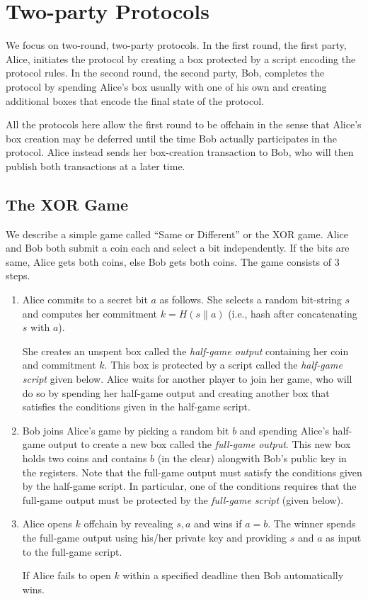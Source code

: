 \documentclass[11pt]{article}
\begin{document}
\section{Two-party Protocols}

We focus on two-round, two-party protocols. %
In the first round, the first party, Alice, initiates the protocol by creating a box  protected by a script encoding the protocol rules. In the second round, the second party, Bob, completes the protocol by spending Alice's box usually with one of his own and creating additional boxes that encode the final state of the protocol. 

All the protocols here allow the first round to be offchain in the sense that Alice's box creation may be deferred until the time Bob actually participates in the protocol. Alice instead sends her box-creation transaction to Bob, who will then publish both transactions at a later time. 
\subsection{The XOR Game}

We describe a simple game called ``Same or Different'' or the XOR game. Alice and Bob both submit a coin each and select a bit independently. If the bits are same, Alice gets both coins, else Bob gets both coins. The game consists of 3 steps. 
\begin{enumerate}
	\item Alice commits to a secret bit $a$ as follows. She selects a random bit-string $s$ and computes her commitment $k = H(s\|a)$ (i.e., hash after concatenating $s$ with $a$).
	
	She creates an unspent box called the {\em half-game output} containing her coin and commitment $k$. This box is protected by a script called the {\em half-game script}  given below. Alice waits for another player to join her game, who will do so by spending her half-game output and creating another box that satisfies the conditions given in the half-game script. %
	
	\item Bob joins Alice's game by picking a random bit $b$ and spending Alice's half-game output to create a new box called the {\em full-game output}. This new box  holds two coins and contains $b$ (in the clear) alongwith Bob's public key in the registers. 
	Note that the full-game output must satisfy the conditions given by the half-game script. In particular, one of the conditions requires that the full-game output must be protected by the {\em full-game script} (given below).
	\item Alice opens $k$ offchain by revealing $s, a$ and wins if $a = b$. The winner spends the full-game output using his/her private key and providing $s$ and $a$ as input to the full-game script.

	If Alice fails to open $k$ within a specified deadline then Bob automatically wins. 
\end{enumerate}
\end{document}
